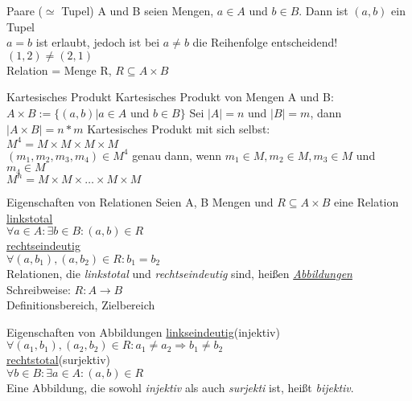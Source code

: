 \begin{frame}{Paare ($\simeq$ Tupel)}
	A und B seien Mengen, $a\in A$ und $b\in B$.
	Dann ist $(a,b)$ ein Tupel\\
	$a = b$ ist erlaubt, jedoch ist bei $ a\neq b$ die Reihenfolge entscheidend! $(1, 2) \neq (2, 1)$\\
	Relation = Menge R, $R\subseteq A\times B$
\end{frame}

\begin{frame}{Kartesisches Produkt}
	Kartesisches Produkt von Mengen A und B:\\
	$A \times B := \{ (a, b)\vert a\in A$ und $b\in B\}$
	Sei $\lvert A\rvert = n$ und $\lvert B\rvert = m$, dann $\lvert A\times B\rvert = n * m$
	Kartesisches Produkt mit sich selbst:\\
	$M^{4} = M\times M\times M\times M$\\
	$(m_{1}, m_{2}, m_{3}, m_{4})\in M^{4}$ genau dann, wenn $m_{1}\in M, m_{2}\in M, m_{3}\in M$ und $m_{4}\in M$\\
	$M^{n} = M \times M\times\dots\times M\times M$
\end{frame}

\begin{frame}{Eigenschaften von Relationen}
	Seien A, B Mengen und $R\subseteq A\times B$ eine Relation\\
	\underline{linkstotal}\\
	$\forall a\in A:\exists b\in B: (a,b)\in R$\\
	\underline{rechtseindeutig}\\
	$\forall (a, b_{1}), (a, b_{2})\in R: b_{1} = b_{2}$\\

	Relationen, die \emph{linkstotal} und \emph{rechtseindeutig} sind, heißen \emph{\underline{Abbildungen}}\\
	Schreibweise: $R: A\longrightarrow B$\\
	Definitionsbereich, Zielbereich %
\end{frame}

\begin{frame}{Eigenschaften von Abbildungen}
	\underline{linkseindeutig}(injektiv)\\
	$\forall (a_{1}, b_{1}), (a_{2}, b_{2})\in R: a_{1} \neq a_{2}\Rightarrow b_{1} \neq b_{2}$\\%
	\underline{rechtstotal}(surjektiv)\\
	$\forall b\in B: \exists a\in A: (a, b)\in R$\\
	Eine Abbildung, die  sowohl \emph {injektiv} als auch \emph{surjekti} ist, heißt \emph{bijektiv}.
\end{frame}

